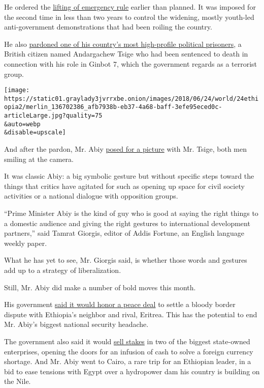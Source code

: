 He ordered the
\href{https://www.ft.com/content/d385d31a-6672-11e8-8cf3-0c230fa67aec}{lifting
of emergency rule} earlier than planned. It was imposed for the second
time in less than two years to control the widening, mostly youth-led
anti-government demonstrations that had been roiling the country.

He also
\href{https://www.reuters.com/article/us-ethiopia-politics/ethiopia-pardons-senior-opposition-leader-sentenced-to-death-idUSKCN1IR0AS}{pardoned
one of his country's most high-profile political prisoners}, a British
citizen named Andargachew Tsige who had been sentenced to death in
connection with his role in Ginbot 7, which the government regards as a
terrorist group.

\texttt{[image: https://static01.graylady3jvrrxbe.onion/images/2018/06/24/world/24ethiopia2/merlin\_136702386\_afb7938b-eb37-4a68-baff-3efe95eced0c-articleLarge.jpg?quality=75\\\&auto=webp\\\&disable=upscale]}

And after the pardon, Mr. Abiy
\href{https://twitter.com/malonebarry/status/1004073615179083776}{posed
for a picture} with Mr. Tsige, both men smiling at the camera.

It was classic Abiy: a big symbolic gesture but without specific steps
toward the things that critics have agitated for such as opening up
space for civil society activities or a national dialogue with
opposition groups.

``Prime Minister Abiy is the kind of guy who is good at saying the right
things to a domestic audience and giving the right gestures to
international development partners,'' said Tamrat Giorgis, editor of
Addis Fortune, an English language weekly paper.

What he has yet to see, Mr. Giorgis said, is whether those words and
gestures add up to a strategy of liberalization.

Still, Mr. Abiy did make a number of bold moves this month.

His government
\href{https://www.nytimes3xbfgragh.onion/2018/06/05/world/africa/ethiopia-eritrea-peace-deal.html?rref=collection\%2Fsectioncollection\%2Fworld\&action=click\&contentCollection=world\&region=rank\&module=package\&version=highlights\&contentPlacement=5\&pgtype=sectionfront}{said
it would honor a peace deal} to settle a bloody border dispute with
Ethiopia's neighbor and rival, Eritrea. This has the potential to end
Mr. Abiy's biggest national security headache.

The government also said it would
\href{https://www.bloomberg.com/news/articles/2018-06-05/ethiopia-moves-to-open-telecoms-airline-to-foreign-investors}{sell
stakes} in two of the biggest state-owned enterprises, opening the doors
for an infusion of cash to solve a foreign currency shortage. And Mr.
Abiy went to Cairo, a rare trip for an Ethiopian leader, in a bid to
ease tensions with Egypt over a hydropower dam his country is building
on the Nile.

